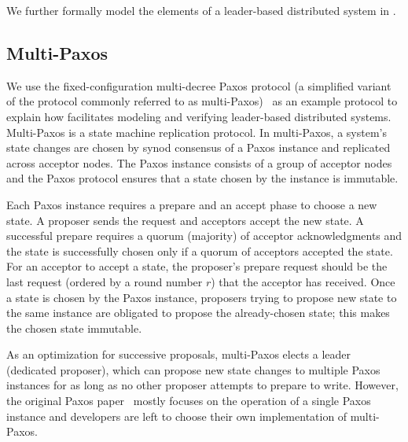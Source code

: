 We further formally model the elements of a leader-based distributed system in
.

\subsection{Multi-Paxos}

We use the fixed-configuration multi-decree Paxos protocol (a simplified variant
of the protocol commonly referred to as multi-Paxos)~\cite{rvrpaxos}
as an example protocol to explain how \sysname{} facilitates modeling and
verifying leader-based distributed systems. Multi-Paxos is a
state machine replication protocol. In multi-Paxos, a system's state changes
are chosen by synod consensus of a Paxos instance and replicated across acceptor nodes.
The Paxos instance consists of a group of acceptor nodes and the Paxos protocol
ensures that a state chosen by the instance is immutable.

Each Paxos instance requires a prepare and an accept phase to choose a new
state. A proposer sends the request and acceptors accept the new state.
A successful prepare requires a quorum (majority) of acceptor acknowledgments
and the state is successfully chosen only if a quorum of acceptors
accepted the state. For an acceptor to accept a state, the proposer's prepare
request should be the last request (ordered by a round number $r$)
that the acceptor has received. Once a state is chosen by the Paxos instance,
proposers trying to propose new state to the same instance are obligated to
propose the already-chosen state; this makes the chosen state immutable.

As an optimization for successive proposals, multi-Paxos elects a
leader (dedicated proposer), which can propose new state changes to multiple Paxos
instances for as long as no other proposer attempts to prepare to write. However, the
original Paxos paper~\cite{paxos, paxosmadesimple} mostly focuses on the operation
of a single Paxos instance
and developers are left to choose their own implementation of multi-Paxos.

